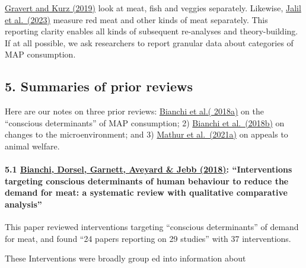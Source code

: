 \documentclass[
  letterpaper,
  DIV=11,
  numbers=noendperiod]{scrartcl}
\let\oldparagraph\paragraph
\renewcommand{\paragraph}[1]{\oldparagraph{#1}\mbox{}}
\begin{document}
\href{https://www.cambridge.org/core/journals/behavioural-public-policy/article/abs/nudging-a-la-carte-a-field-experiment-on-climatefriendly-food-choice/7EAA47F30FEAA990FC4F7EAAF9CAC0C0}{Gravert
and Kurz (2019)} look at meat, fish and veggies separately. Likewise,
\href{https://www.nature.com/articles/s43016-023-00712-1}{Jalil et
al.~(2023)} measure red meat and other kinds of meat separately. This
reporting clarity enables all kinds of subsequent re-analyses and
theory-building. If at all possible, we ask researchers to report
granular data about categories of MAP consumption.

\subsection{5. Summaries of prior
reviews}\label{summaries-of-prior-reviews}

Here are our notes on three prior reviews:
\href{https://ijbnpa.biomedcentral.com/articles/10.1186/s12966-018-0729-6}{Bianchi
et al.( 2018a)} on the ``conscious determinants'' of MAP consumption; 2)
\href{https://www.thelancet.com/journals/lanplh/article/PIIS2542-5196(18)30188-8/fulltext}{Bianchi
et al.~(2018b)} on changes to the microenvironment; and 3)
\href{https://www.sciencedirect.com/science/article/pii/S0195666321001847}{Mathur
et al.~(2021a)} on appeals to animal welfare.

\paragraph{\texorpdfstring{5.1
\href{https://ijbnpa.biomedcentral.com/articles/10.1186/s12966-018-0729-6}{Bianchi,
Dorsel, Garnett, Aveyard \& Jebb (2018)}: ``Interventions targeting
conscious determinants of human behaviour to reduce the demand for meat:
a systematic review with qualitative comparative
analysis''}{5.1 Bianchi, Dorsel, Garnett, Aveyard \& Jebb (2018): ``Interventions targeting conscious determinants of human behaviour to reduce the demand for meat: a systematic review with qualitative comparative analysis''}}\label{bianchi-dorsel-garnett-aveyard-jebb-2018-interventions-targeting-conscious-determinants-of-human-behaviour-to-reduce-the-demand-for-meat-a-systematic-review-with-qualitative-comparative-analysis}

This paper reviewed interventions targeting ``conscious determinants''
of demand for meat, and found ``24 papers reporting on 29 studies'' with
37 interventions.

These Interventions were broadly group ed into information about
\end{document}

